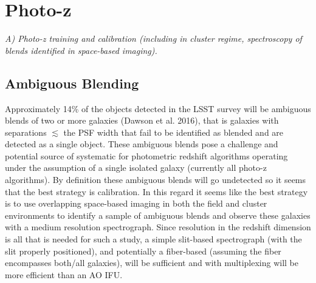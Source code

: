 
\section{Photo-z}
\label{sec:photoz}

{\em A) Photo-z training and calibration (including in cluster regime,
spectroscopy of blends identified in space-based imaging).}

%
%


\subsection{Ambiguous Blending}
Approximately 14\% of the objects detected in the LSST survey will be ambiguous
blends of two or more galaxies (Dawson et al. 2016), that is galaxies with
separations $\lesssim$ the PSF width that fail to be identified as blended and
are detected as a single object. These ambiguous blends pose a challenge and
potential source of systematic for photometric redshift algorithms operating
under the assumption of a single isolated galaxy (currently all photo-z
algorithms). By definition these ambiguous blends will go undetected so it seems
that the best strategy is calibration. In this regard it seems like the best
strategy is to use overlapping space-based imaging in both the field and cluster
environments to identify a sample of ambiguous blends and observe these galaxies
with a medium resolution spectrograph. Since resolution in the redshift
dimension is all that is needed for such a study, a simple slit-based
spectrograph (with the slit properly positioned), and potentially a fiber-based
(assuming the fiber encompasses both/all galaxies), will be sufficient and with
multiplexing will be more efficient than an AO IFU.
